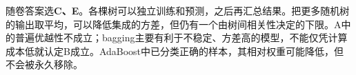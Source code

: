 随卷答案选\textbf{C、E}。各棵树可以独立训练和预测，之后再汇总结果。把更多随机树的输出取平均，可以降低集成的方差，但仍有一个由树间相关性决定的下限。A中的普遍优越性不成立；bagging主要有利于不稳定、方差高的模型，不能仅凭计算成本低就认定B成立。AdaBoost中已分类正确的样本，其相对权重可能降低，但不会被永久移除。
